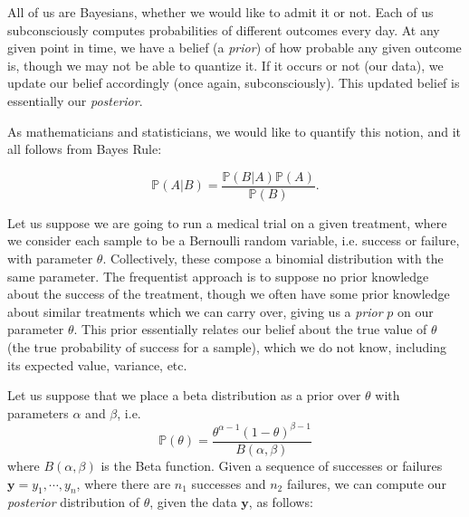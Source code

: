 

All of us are Bayesians, whether we would like to admit it or not. Each of us subconsciously computes probabilities of different outcomes every day. At any given point in time, we have a belief (a \emph{prior}) of how probable any given outcome is, though we may not be able to quantize it. If it occurs or not (our data), we update our belief accordingly (once again, subconsciously). This updated belief is essentially our \emph{posterior}.

As mathematicians and statisticians, we would like to quantify this notion, and it all follows from Bayes Rule:

$$\mathbb{P}(A | B) = \frac{\mathbb{P}(B | A)\mathbb{P}(A)}{\mathbb{P}(B)}.$$

Let us suppose we are going to run a medical trial on a given treatment, where we consider each sample to be a Bernoulli random variable, i.e. success or failure, with parameter $\theta$. Collectively, these compose a binomial distribution with the same parameter. The frequentist approach is to suppose no prior knowledge about the success of the treatment, though we often have some prior knowledge about similar treatments which we can carry over, giving us a \emph{prior} $p$ on our parameter $\theta$. This prior essentially relates our belief about the true value of $\theta$ (the true probability of success for a sample), which we do not know, including its expected value, variance, etc.

Let us suppose that we place a beta distribution as a prior over $\theta$ with parameters $\alpha$ and $\beta$, i.e. $$\mathbb{P}(\theta) = \frac{\theta^{\alpha - 1}(1 - \theta)^{\beta - 1}}{B(\alpha,\beta)}$$ where $B(\alpha,\beta)$ is the Beta function. Given a sequence of successes or failures $\mathbf{y} = y_{1},\cdots,y_{n}$, where there are $n_{1}$ successes and $n_{2}$ failures, we can compute our \emph{posterior} distribution of $\theta$, given the data $\mathbf{y}$, as follows:

